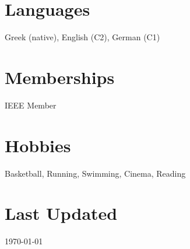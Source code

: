 \documentclass[margin]{res}
\begin{document}
\begin{resume}
\section{Languages} Greek (native), English (C2), German (C1)

\section{Memberships} IEEE Member

\begin{comment}
\section{References \\ available \\ upon request}
\end{comment}

\section{Hobbies}
Basketball, Running, Swimming, Cinema, Reading

\section{Last Updated} \today

\end{resume}
\(\)
\end{document}
